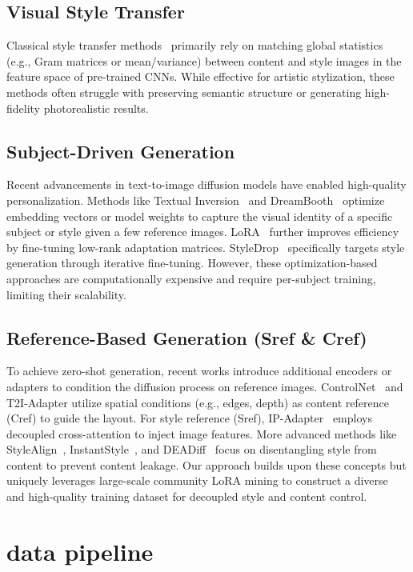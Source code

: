 \documentclass[runningheads]{llncs}
\begin{document}
\subsection{Visual Style Transfer}
Classical style transfer methods~\cite{huang2017adain,li2017wct} primarily rely on matching global statistics (e.g., Gram matrices or mean/variance) between content and style images in the feature space of pre-trained CNNs. While effective for artistic stylization, these methods often struggle with preserving semantic structure or generating high-fidelity photorealistic results.

\subsection{Subject-Driven Generation}
Recent advancements in text-to-image diffusion models have enabled high-quality personalization. Methods like Textual Inversion~\cite{gal2023textual} and DreamBooth~\cite{ruiz2023dreambooth} optimize embedding vectors or model weights to capture the visual identity of a specific subject or style given a few reference images. LoRA~\cite{hu2022lora} further improves efficiency by fine-tuning low-rank adaptation matrices. StyleDrop~\cite{sohn2023styledrop} specifically targets style generation through iterative fine-tuning. However, these optimization-based approaches are computationally expensive and require per-subject training, limiting their scalability.

\subsection{Reference-Based Generation (Sref \& Cref)}
To achieve zero-shot generation, recent works introduce additional encoders or adapters to condition the diffusion process on reference images. ControlNet~\cite{zhang2023controlnet} and T2I-Adapter utilize spatial conditions (e.g., edges, depth) as content reference (Cref) to guide the layout. For style reference (Sref), IP-Adapter~\cite{ye2023ipadapter} employs decoupled cross-attention to inject image features. More advanced methods like StyleAlign~\cite{wu2024stylealign}, InstantStyle~\cite{wang2024instantstyle}, and DEADiff~\cite{qi2024deadiff} focus on disentangling style from content to prevent content leakage. Our approach builds upon these concepts but uniquely leverages large-scale community LoRA mining to construct a diverse and high-quality training dataset for decoupled style and content control.

\section{data pipeline}
\end{document}
